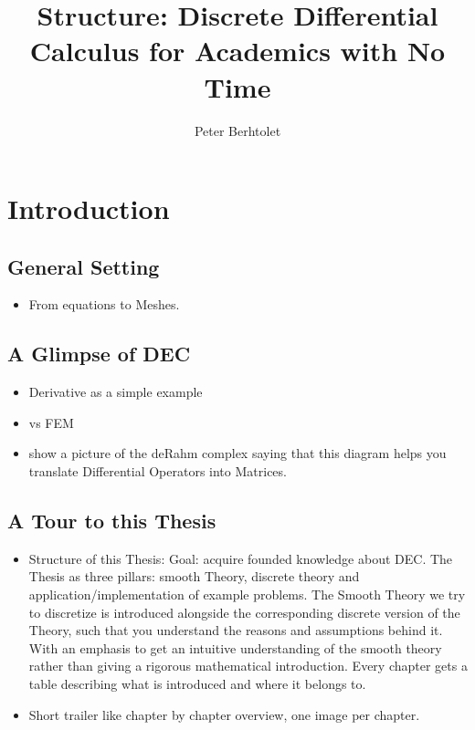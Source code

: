 \documentclass{scrartcl}
\title{Structure: Discrete Differential Calculus for Academics with No Time}
\author{Peter Berhtolet}
\begin{document}
	\maketitle
	\tableofcontents
	
\section{Introduction}
	
	\subsection{General Setting}
		\begin{itemize}
			\item From equations to Meshes.
		\end{itemize}
	\subsection{A Glimpse of DEC}
		\begin{itemize}
			\item Derivative as a simple example 
			\item vs FEM 
			\item show a picture of the deRahm complex saying that this diagram helps you translate Differential Operators into Matrices.
		\end{itemize}

	\subsection{A Tour to this Thesis}
		\begin{itemize}
		\item	Structure of this Thesis: Goal: acquire founded knowledge about DEC. The Thesis as three pillars: smooth Theory, discrete theory and application/implementation of example problems. The Smooth Theory we try to discretize is introduced alongside the corresponding discrete version of the Theory, such that you understand  the reasons and assumptions behind it. With an emphasis to get an intuitive understanding of the smooth theory rather than giving a rigorous mathematical introduction. Every chapter gets a table describing what is introduced and where it belongs to.
		
		\item Short trailer like chapter by chapter overview, one image per chapter.
		\end{itemize}
		
\end{document}
